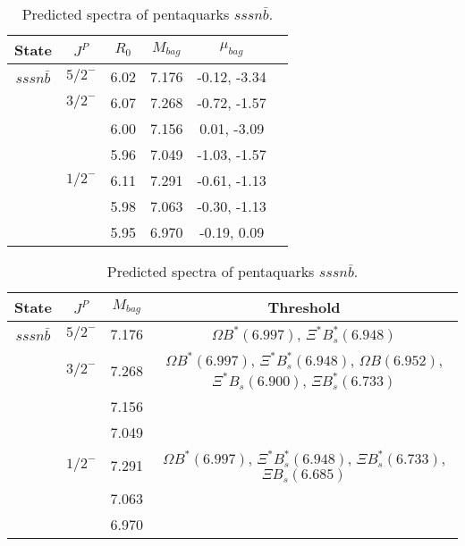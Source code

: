 \documentclass[prd,twocolumn,floatfix,nofootinbib]{revtex4}
\begin{document}
\renewcommand{\tabcolsep}{0.5cm}
\renewcommand{\arraystretch}{1.2}
\begin{table*}[!htbp]
    \caption{Predicted spectra of pentaquarks $sssn\bar{b}$.}
    \begin{tabular}{cccccc}
        \hline\hline
        {\rm State} &$J^{P}$ &$R_{0}$ &$M_{bag}$ &$\mu_{bag}$  \\ \hline
        $sssn\bar{b}$
            &${5/2}^{-}$    &6.02   &7.176  &-0.12, -3.34     \\
            &${3/2}^{-}$    &6.07   &7.268  &-0.72, -1.57  \\
            &               &6.00   &7.156  &0.01, -3.09  \\
            &               &5.96   &7.049  &-1.03, -1.57  \\
            &${1/2}^{-}$    &6.11   &7.291  &-0.61, -1.13  \\
            &               &5.98   &7.063  &-0.30, -1.13  \\
            &               &5.95   &6.970  &-0.19, 0.09  \\
        \hline\hline
    \end{tabular}
\end{table*}

\renewcommand{\tabcolsep}{0.5cm}
\renewcommand{\arraystretch}{1.2}
\begin{table*}[!htbp]
    \caption{Predicted spectra of pentaquarks $sssn\bar{b}$.}
    \begin{tabular}{cccc}
        \hline\hline
        {\rm State} &$J^{P}$ &$M_{bag}$ &{\rm Threshold} \\ \hline
        $sssn\bar{b}$
            &${5/2}^{-}$    &7.176 &$\Omega B^{\ast}(6.997)$, $\Xi^{\ast} B^{\ast}_{s}(6.948)$ \\
            &${3/2}^{-}$    &7.268 &$\Omega B^{\ast}(6.997)$, $\Xi^{\ast} B^{\ast}_{s}(6.948)$, $\Omega B(6.952)$, $\Xi^{\ast} B_{s}(6.900)$, $\Xi B^{\ast}_{s}(6.733)$ \\
            &               &7.156 & \\
            &               &7.049 & \\
            &${1/2}^{-}$    &7.291 &$\Omega B^{\ast}(6.997)$, $\Xi^{\ast} B^{\ast}_{s}(6.948)$, $\Xi B^{\ast}_{s}(6.733)$, $\Xi B_{s}(6.685)$ \\
            &               &7.063 & \\
            &               &6.970 & \\
        \hline\hline
    \end{tabular}
\end{table*}
\end{document}
